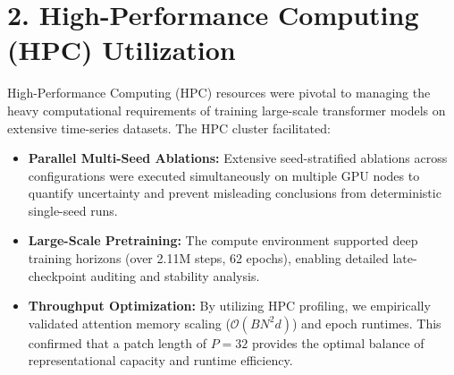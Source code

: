 \documentclass[11pt,a4paper]{article}
\begin{document}
\section*{2. High-Performance Computing (HPC) Utilization}
High-Performance Computing (HPC) resources were pivotal to managing the heavy computational requirements of training large-scale transformer models on extensive time-series datasets. The HPC cluster facilitated:
\begin{itemize}
    \item \textbf{Parallel Multi-Seed Ablations:} Extensive seed-stratified ablations across configurations were executed simultaneously on multiple GPU nodes to quantify uncertainty and prevent misleading conclusions from deterministic single-seed runs.
    \item \textbf{Large-Scale Pretraining:} The compute environment supported deep training horizons (over 2.11M steps, 62 epochs), enabling detailed late-checkpoint auditing and stability analysis.
    \item \textbf{Throughput Optimization:} By utilizing HPC profiling, we empirically validated attention memory scaling ($\mathcal{O}(BN^2d)$) and epoch runtimes. This confirmed that a patch length of $P=32$ provides the optimal balance of representational capacity and runtime efficiency.
\end{itemize}

\end{document}
